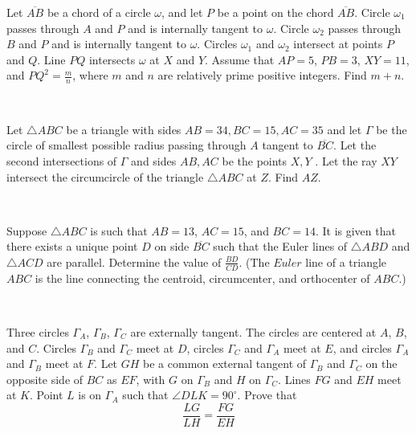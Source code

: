 \documentclass[mast]{lucky}
\begin{document}
\begin{prob}[AIME I 2019/15]{9}
Let $\overline{AB}$ be a chord of a circle $\omega$, and let $P$ be a point on the chord $\overline{AB}$. Circle $\omega_1$ passes through $A$ and $P$ and is internally tangent to $\omega$. Circle $\omega_2$ passes through $B$ and $P$ and is internally tangent to $\omega$. Circles $\omega_1$ and $\omega_2$ intersect at points $P$ and $Q$. Line $PQ$ intersects $\omega$ at $X$ and $Y$. Assume that $AP=5$, $PB=3$, $XY=11$, and $PQ^2 = \tfrac{m}{n}$, where $m$ and $n$ are relatively prime positive integers. Find $m+n$.
\end{prob}\\
\begin{req}[PuMaC 2020 G7]{9}
Let $\triangle ABC$ be a triangle with sides $AB = 34, BC = 15, AC = 35$ and let $\Gamma$ be the circle of smallest possible radius passing through $A$ tangent to $\overline{BC}$. Let the second intersections of $\Gamma$ and sides $AB, AC$ be the points $X, Y$ . Let the ray $XY$ intersect the circumcircle of the triangle $\triangle ABC$ at $Z$. Find $AZ$.
\end{req}\\
\begin{prob}[CMIMC 2017 G10]{9}
Suppose $\triangle ABC$ is such that $AB=13$, $AC=15$, and $BC=14$. It is given that there exists a unique point $D$ on side $\overline{BC}$ such that the Euler lines of $\triangle ABD$ and $\triangle ACD$ are parallel. Determine the value of $\tfrac{BD}{CD}$. (The $\textit{Euler}$ line of a triangle $ABC$ is the line connecting the centroid, circumcenter, and orthocenter of $ABC$.)
\end{prob}\\
\begin{prob}[USMCA 2021/29]{13}
Three circles $\Gamma_A$, $\Gamma_B$, $\Gamma_C$ are externally tangent. The circles are centered at $A$, $B$, and $C$. Circles $\Gamma_B$ and $\Gamma_C$ meet at $D$, circles $\Gamma_C$ and $\Gamma_A$ meet at $E$, and circles $\Gamma_A$ and $\Gamma_B$ meet at $F$. Let $GH$ be a common external tangent of $\Gamma_B$ and $\Gamma_C$ on the opposite side of $BC$ as $EF$, with $G$ on $\Gamma_B$ and $H$ on $\Gamma_C$. Lines $FG$ and $EH$ meet at $K$. Point $L$ is on $\Gamma_A$ such that $\angle DLK = 90^\circ$. Prove that 
\[\frac{LG}{LH}=\frac{FG}{EH}\]
\end{prob}
\end{document}

